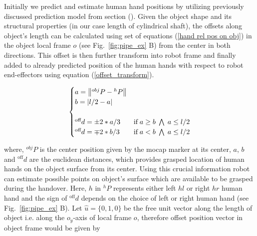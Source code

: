 Initially we predict and estimate human hand positions by utilizing previously discussed prediction model from section (). Given the object shape and its structural properties (in our case length of cylindrical shaft), the offsets along object's length can be calculated using set of equations (\ref{hand rel pos on obj}) in the object local frame $o$ (see Fig.~\ref{fig:pipe_ex} B) from the center in both directions. This offset is then further transform into robot frame and finally added to already predicted position of the human hands with respect to robot end-effectors using equation (\ref{offset_transform}).


\begin{equation}\label{hand rel pos on obj}
\centering
\begin{cases}
a = \norm{{}^{obj}{P} - {}^{h}{P}} & \text{}  \\

b = \abs{l/2 - a}  & \text{} \\
\\
{}^\text{off}{d} = \pm 2*a/3 &  \text{if} \; a \geq b \; \bigwedge \; a\leq l/2\\

{}^\text{off}{d} = \mp 2*b/3 &  \text{if} \; a < b \; \bigwedge \; a\leq l/2\\
\end{cases}
\end{equation}

where, ${}^{obj}{P}$ is the center position given by the mocap marker at its center, $a$, $b$ and ${}^\text{off}{d}$ are the euclidean distances, which provides grasped location of human hands on the object surface from its center. Using this crucial information robot can estimate possible points on object's surface which are available to be grasped during the handover. Here, $h$ in ${}^{h}{P}$ represents either left $hl$ or right $hr$ human hand and the sign of ${}^\text{off}{d}$ depends on the choice of left or right human hand (see Fig.~\ref{fig:pipe_ex} B). Let $\hat{u} = \{0, 1, 0\}$ be the free unit vector along the length of object i.e. along the $o_y$-axis of local frame $o$, therefore offset position vector in object frame would be given by

